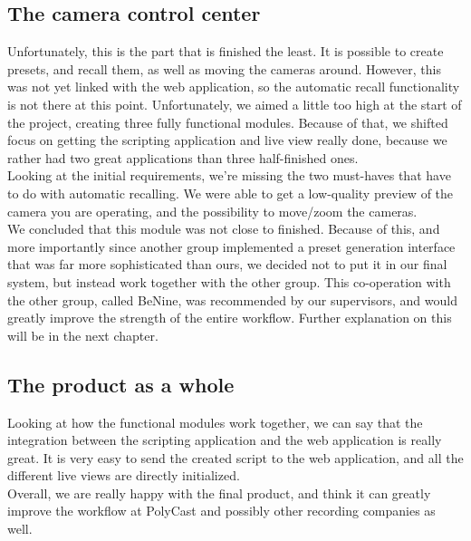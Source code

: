\subsection{The camera control center}
Unfortunately, this is the part that is finished the least. It is possible to create presets, and recall them, as well as moving the cameras around. However, this was not yet linked with the web application, so the automatic recall functionality is not there at this point. Unfortunately, we aimed a little too high at the start of the project, creating three fully functional modules. Because of that, we shifted focus on getting the scripting application and live view really done, because we rather had two great applications than three half-finished ones.\\
Looking at the initial requirements, we're missing the two must-haves that have to do with automatic recalling. We were able to get a low-quality preview of the camera you are operating, and the possibility to move/zoom the cameras.\\
We concluded that this module was not close to finished. Because of this, and more importantly since another group implemented a preset generation interface that was far more sophisticated than ours, we decided not to put it in our final system, but instead work together with the other group. This co-operation with the other group, called BeNine, was recommended by our supervisors, and would greatly improve the strength of the entire workflow. Further explanation on this will be in the next chapter.

\subsection*{The product as a whole}
Looking at how the functional modules work together, we can say that the integration between the scripting application and the web application is really great. It is very easy to send the created script to the web application, and all the different live views are directly initialized.\\
Overall, we are really happy with the final product, and think it can greatly improve the workflow at PolyCast and possibly other recording companies as well.